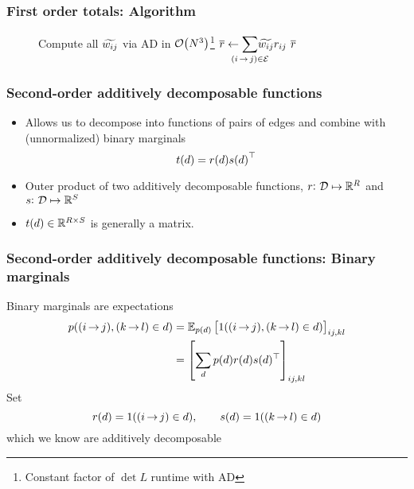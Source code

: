 \documentclass{beamer}
\begin{document}
\begin{frame}
\frametitle{First order totals: Algorithm}

\begin{figure}[H]
\begin{algorithmic}[1]


\State Compute all ${\widetilde{w_{ij}}}$ via AD in $\mathcal{O}\!\left({N}^3\right)$\footnote{
        Constant factor of $\det{L}$ runtime with AD}
\State $\rbar \gets {\displaystyle\smashoperator{\sum_{\edgeij\in\edges}}}
     \totalw{ij} \redge{ij}$ {\color{gray}\algorithmiccomment{ $\bigo{\nN^2\nRs}$ }} \label{line:rbar}
\State \Return ${\overline{r}}$
\EndFunc
\end{algorithmic}
\end{figure}

\end{frame}

\begin{frame}
\frametitle{Second-order additively decomposable functions}
\begin{itemize}
\item Allows us to decompose into functions of pairs of edges and combine with (unnormalized)
    binary marginals
\begin{equation}\label{eq:first-order}
    {t({d})} = {r({d})} {s({d})}^\top
\end{equation}
\item Outer product of two additively decomposable functions, $r{:}\,\,{\mathcal{D}} \mapsto \mathbb{R}^{{R}}$ and  $s{:}\,\,{\mathcal{D}} \mapsto \mathbb{R}^{{S}}$
\item ${t({d})} \in \mathbb{R}^{{R} \times {S}}$ is generally a matrix.

\end{itemize}
\end{frame}

\begin{frame}
\frametitle{Second-order additively decomposable functions: Binary marginals}
Binary marginals are expectations
\begin{align*}
p({(i\,{\rightarrow}\,j)},{(k\,{\rightarrow}\,l)} \in{d})
&= \mathbb{E}_{{p({d})}}\left[1({(i\,{\rightarrow}\,j)},{(k\,{\rightarrow}\,l)}\in{d})\right]_{ij,kl}\\
&= \left[\sum_d p(d)r(d)s(d)^\top\right]_{ij,kl}
\end{align*}
Set
$${r({d})} = 1({(i\,{\rightarrow}\,j)}\in{d}),\qquad{s({d})} = 1({(k\,{\rightarrow}\,l)}\in{d})$$
which we know are additively decomposable
\end{frame}
\end{document}
